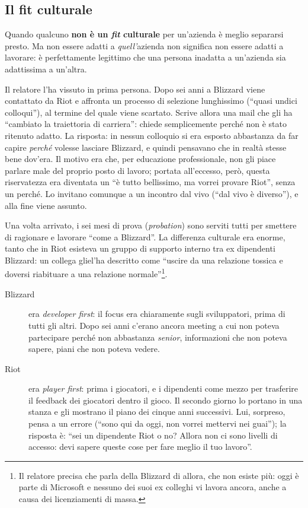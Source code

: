 \subsection{Il fit culturale}

Quando qualcuno \textbf{non è un \emph{fit} culturale} per un'azienda è
meglio separarsi presto. Ma non essere adatti a \emph{quell'}azienda non
significa non essere adatti a lavorare: è perfettamente legittimo che una
persona inadatta a un'azienda sia adattissima a un'altra.

Il relatore l'ha vissuto in prima persona. Dopo sei anni a Blizzard viene
contattato da Riot e affronta un processo di selezione lunghissimo (``quasi
undici colloqui''), al termine del quale viene scartato. Scrive allora una
mail che gli ha ``cambiato la traiettoria di carriera'': chiede
semplicemente perché non è stato ritenuto adatto. La risposta: in nessun
colloquio si era esposto abbastanza da far capire \emph{perché} volesse
lasciare Blizzard, e quindi pensavano che in realtà stesse bene dov'era. Il
motivo era che, per educazione professionale, non gli piace parlare male del
proprio posto di lavoro; portata all'eccesso, però, questa riservatezza era
diventata un ``è tutto bellissimo, ma vorrei provare Riot'', senza un perché.
Lo invitano comunque a un incontro dal vivo (``dal vivo è diverso''), e alla
fine viene assunto.

Una volta arrivato, i sei mesi di prova (\emph{probation}) sono serviti tutti
per smettere di ragionare e lavorare ``come a Blizzard''. La differenza
culturale era enorme, tanto che in Riot esisteva un gruppo di supporto
interno tra ex dipendenti Blizzard: un collega gliel'ha descritto come
``uscire da una relazione tossica e doversi riabituare a una relazione
normale''\footnote{Il relatore precisa che parla della Blizzard di allora,
che non esiste più: oggi è parte di Microsoft e nessuno dei suoi ex colleghi
vi lavora ancora, anche a causa dei licenziamenti di massa.}.
\begin{description}
  \item[Blizzard] era \emph{developer first}: il focus era chiaramente sugli
        sviluppatori, prima di tutti gli altri. Dopo sei anni c'erano ancora
        meeting a cui non poteva partecipare perché non abbastanza
        \emph{senior}, informazioni che non poteva sapere, piani che non
        poteva vedere.
  \item[Riot] era \emph{player first}: prima i giocatori, e i dipendenti come
        mezzo per trasferire il feedback dei giocatori dentro il gioco. Il
        secondo giorno lo portano in una stanza e gli mostrano il piano dei
        cinque anni successivi. Lui, sorpreso, pensa a un errore (``sono qui
        da oggi, non vorrei mettervi nei guai''); la risposta è: ``sei un
        dipendente Riot o no? Allora non ci sono livelli di accesso: devi
        sapere queste cose per fare meglio il tuo lavoro''.
\end{description}

